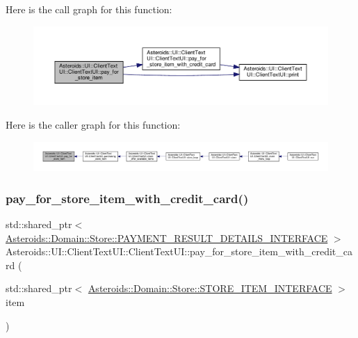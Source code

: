 Here is the call graph for this function\+:
\nopagebreak
\begin{figure}[H]
\begin{center}
\leavevmode
\includegraphics[width=350pt]{classAsteroids_1_1UI_1_1ClientTextUI_1_1ClientTextUI_a4613a9af03e06c960c467b0b6be44db9_cgraph}
\end{center}
\end{figure}
Here is the caller graph for this function\+:
\nopagebreak
\begin{figure}[H]
\begin{center}
\leavevmode
\includegraphics[width=350pt]{classAsteroids_1_1UI_1_1ClientTextUI_1_1ClientTextUI_a4613a9af03e06c960c467b0b6be44db9_icgraph}
\end{center}
\end{figure}
\mbox{\label{classAsteroids_1_1UI_1_1ClientTextUI_1_1ClientTextUI_a02d420d49c44459fe7a2af9b0000adf9}} 
\subsubsection{\texorpdfstring{pay\+\_\+for\+\_\+store\+\_\+item\+\_\+with\+\_\+credit\+\_\+card()}{pay\_for\_store\_item\_with\_credit\_card()}}
{\footnotesize\ttfamily std\+::shared\+\_\+ptr$<$ \hyperlink{classAsteroids_1_1Domain_1_1Store_1_1PAYMENT__RESULT__DETAILS__INTERFACE}{Asteroids\+::\+Domain\+::\+Store\+::\+P\+A\+Y\+M\+E\+N\+T\+\_\+\+R\+E\+S\+U\+L\+T\+\_\+\+D\+E\+T\+A\+I\+L\+S\+\_\+\+I\+N\+T\+E\+R\+F\+A\+CE} $>$ Asteroids\+::\+U\+I\+::\+Client\+Text\+U\+I\+::\+Client\+Text\+U\+I\+::pay\+\_\+for\+\_\+store\+\_\+item\+\_\+with\+\_\+credit\+\_\+card (\begin{DoxyParamCaption}\item[{std\+::shared\+\_\+ptr$<$ \hyperlink{classAsteroids_1_1Domain_1_1Store_1_1STORE__ITEM__INTERFACE}{Asteroids\+::\+Domain\+::\+Store\+::\+S\+T\+O\+R\+E\+\_\+\+I\+T\+E\+M\+\_\+\+I\+N\+T\+E\+R\+F\+A\+CE} $>$}]{item }\end{DoxyParamCaption})\hspace{0.3cm}{\ttfamily [private]}}



